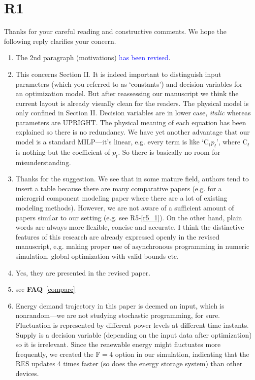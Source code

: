\documentclass[11pt]{article}
\newcommand{\faq}[1]{\textbf{FAQ}~\ref{#1}}
\newcommand{\blue}[1]{\textcolor{blue}{#1}}
\begin{document}
\section{R1} \label{r1ans}
Thanks for your careful reading and constructive comments. We hope the following reply clarifies your concern.
\begin{enumerate}
    \item The 2nd paragraph (motivations) \blue{has been revised}.
    \item This concerns Section II. It is indeed important to distinguish input parameters (which you referred to as `constants') and decision variables for an optimization model. But after reassessing our manuscript we think the current layout is already visually clean for the readers. The physical model is only confined in Section II. Decision variables are in lower case, \textit{italic} whereas parameters are UPRIGHT. The physical meaning of each equation has been explained so there is no redundancy. We have yet another advantage that our model is a standard MILP---it's linear, e.g. every term is like `$\mathrm{C_t}p_t$', where $\mathrm{C}_t$ is nothing but the coefficient of $p_t$. So there is basically no room for misunderstanding.
    \item Thanks for the suggestion. We see that in some mature field, authors tend to insert a table because there are many comparative papers
    (e.g. for a microgrid component modeling paper where there are a lot of existing modeling methods). However, we are not aware of a
    sufficient amount of papers similar to our setting (e.g. see R5-\ref{r5_1}). On the other hand, plain words are always more flexible, concise and accurate. I think the distinctive features of this research are already expressed openly in the revised manuscript, e.g. making proper use of asynchronous programming in numeric simulation, global optimization with valid bounds etc.
    \item Yes, they are presented in the revised paper.
    \item see \faq{compare}
    \item Energy demand trajectory in this paper is deemed an input, which is nonrandom---we are not studying stochastic programming, for sure.
    Fluctuation is represented by different power levels at different time instants.
    Supply is a decision variable (depending on the input data after optimization) so it is irrelevant.
    Since the renewable energy might fluctuates more frequently, we created the $\mathrm{F}=4$ option in our simulation, indicating that the RES updates 4 times faster (so does the energy storage system) than other devices. 

\end{enumerate}
\end{document}
